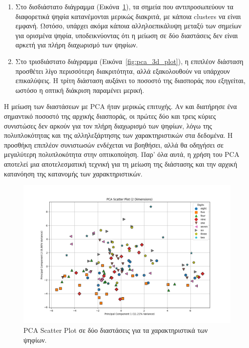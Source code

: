 \documentclass[a4paper,12pt]{article}
\begin{document}
\begin{enumerate}
  \item Στο δισδιάστατο διάγραμμα (Εικόνα~\ref{fig:pca_2d_plot}), τα σημεία που αντιπροσωπεύουν τα διαφορετικά ψηφία κατανέμονται μερικώς διακριτά, με κάποια clusters να είναι εμφανή. Ωστόσο, υπάρχει ακόμα κάποια αλληλοεπικάλυψη μεταξύ των σημείων για ορισμένα ψηφία, υποδεικνύοντας ότι η μείωση σε δύο διαστάσεις δεν είναι αρκετή για πλήρη διαχωρισμό των ψηφίων.

  \item Στο τρισδιάστατο διάγραμμα (Εικόνα~\ref{fig:pca_3d_plot}), η επιπλέον διάσταση προσθέτει λίγο περισσότερη διακριτότητα, αλλά εξακολουθούν να υπάρχουν επικαλύψεις. Η τρίτη διάσταση αυξάνει το ποσοστό της διασποράς που εξηγείται, ωστόσο η οπτική διάκριση παραμένει μερική.

\end{enumerate}

Η μείωση των διαστάσεων με PCA ήταν μερικώς επιτυχής. Αν και διατήρησε ένα σημαντικό ποσοστό της αρχικής διασποράς, οι πρώτες δύο και τρεις κύριες συνιστώσες δεν αρκούν για τον πλήρη διαχωρισμό των ψηφίων, λόγω της πολυπλοκότητας και της αλληλεξάρτησης των χαρακτηριστικών στα δεδομένα. Η προσθήκη επιπλέον συνιστωσών ενδέχεται να βοηθήσει, αλλά θα οδηγήσει σε μεγαλύτερη πολυπλοκότητα στην οπτικοποίηση. Παρ' όλα αυτά, η χρήση του PCA αποτελεί μια αποτελεσματική τεχνική για τη μείωση της διάστασης και την αρχική κατανόηση της κατανομής των χαρακτηριστικών.

\begin{figure}[h]
    \centering
    \includegraphics[width=\textwidth]{images/pca_2d_plot.png}
    \caption{PCA Scatter Plot σε δύο διαστάσεις για τα χαρακτηριστικά των ψηφίων.}
    \label{fig:pca_2d_plot}
\end{figure}
\end{document}
